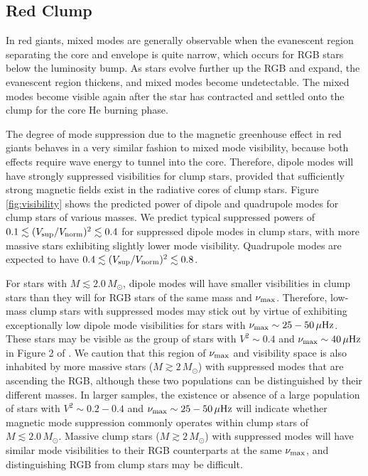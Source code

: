 \subsection{Red Clump}
\label{clump}
  

In red giants, mixed modes are generally observable when the evanescent region separating the core and envelope is quite narrow, which occurs for RGB stars below the luminosity bump. As stars evolve further up the RGB and expand, the evanescent region thickens, and mixed modes become undetectable. The mixed modes become visible again after the star has contracted and settled onto the clump for the core He burning phase. 

The degree of mode suppression due to the magnetic greenhouse effect in red giants behaves in a very similar fashion to mixed mode visibility, because both effects require wave energy to tunnel into the core. Therefore, dipole modes will have strongly suppressed visibilities for clump stars, provided that sufficiently strong magnetic fields exist in the radiative cores of clump stars. Figure \ref{fig:visibility} shows the predicted power of dipole and quadrupole modes for clump stars of various masses. We predict typical suppressed powers of $0.1 \lesssim (V_{\rm sup}/V_{\rm norm})^2 \lesssim 0.4$ for suppressed dipole modes in clump stars, with more massive stars exhibiting slightly lower mode visibility. Quadrupole modes are expected to have $0.4 \lesssim (V_{\rm sup}/V_{\rm norm})^2 \lesssim 0.8$. 

For stars with $M \lesssim 2.0 \, M_\odot$, dipole modes will have smaller visibilities in clump stars than they will for RGB stars of the same mass and $\nu_{\rm max}$. Therefore, low-mass clump stars with suppressed modes may stick out by virtue of exhibiting exceptionally low dipole mode visibilities for stars with $\nu_{\rm max} \sim 25-50 \, \mu {\rm Hz}$. These stars may be visible as the group of stars with $V^2 \sim 0.4$ and $\nu_{\rm max} \sim 40 \, \mu {\rm Hz}$ in Figure 2 of \cite{Fuller_2015}. We caution that this region of $\nu_{\rm max}$ and visibility space is also inhabited by more massive stars ($M \gtrsim 2 \, M_\odot$) with suppressed modes that are ascending the RGB, although these two populations can be distinguished by their different masses. In larger samples, the existence or absence of a large population of stars with $V^2 \sim 0.2-0.4$ and $\nu_{\rm max} \sim 25-50 \, \mu {\rm Hz}$ will indicate whether magnetic mode suppression commonly operates within clump stars of $M \lesssim 2.0 \, M_\odot$. Massive clump stars ($M \gtrsim 2 \, M_\odot$) with suppressed modes will have similar mode visibilities to their RGB counterparts at the same $\nu_{\rm max}$, and distinguishing RGB from clump stars may be difficult.
  
  
  
  
  
  
  
  
  